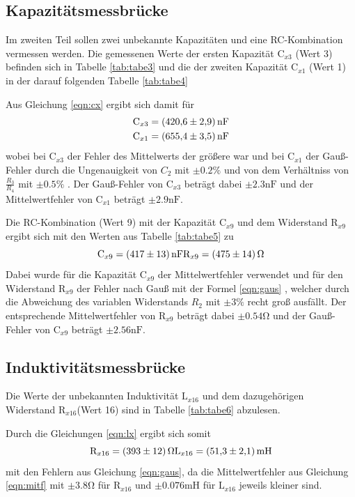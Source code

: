 \subsection{Kapazitätsmessbrücke}
Im zweiten Teil sollen zwei unbekannte Kapazitäten und eine RC-Kombination
vermessen werden. Die gemessenen Werte der ersten Kapazität $ \text{C}_{x3} $ (Wert 3) befinden
sich in Tabelle \ref{tab:tabe3} und die der zweiten Kapazität $ \text{C}_{x1} $
(Wert 1) in der
darauf folgenden Tabelle \ref{tab:tabe4}


\noindent Aus Gleichung \ref{eqn:cx}
ergibt sich damit für
\begin{align*}
  \text{C}_{x3} = \SI{420.6 (29)}{\nano\farad} \\
  \text{C}_{x1} = \SI{655.4 (35)}{\nano\farad}
\end{align*}
wobei bei $ \text{C}_{x3} $ der Fehler des Mittelwerts der größere war und bei
$ \text{C}_{x1} $ der Gauß-Fehler durch die Ungenauigkeit von $C_2$ mit $ \pm 0.2
\% $ und von dem Verhältniss von $ \frac{R_3}{R_4} $ mit $ \pm 0.5 \% $ .
Der Gauß-Fehler von $ \text{C}_{x3} $ beträgt
dabei $ \pm 2.3 \si{\nano\farad} $ und der Mittelwertfehler von $ \text{C}_{x1} $
beträgt $ \pm 2.9 \si{\nano\farad} $.


\noindent Die RC-Kombination (Wert 9) mit der Kapazität $ \text{C}_{x9} $ und dem
Widerstand $ \text{R}_{x9} $ ergibt sich
mit den Werten aus Tabelle \ref{tab:tabe5} zu
\begin{equation*}
  \text{C}_{x9} = \SI{417 (13)}{\nano\farad} \\
  \text{R}_{x9} = \SI{475 (14)}{\ohm}
\end{equation*}
Dabei wurde für die Kapazität $ \text{C}_{x9} $ der Mittelwertfehler verwendet und
für den Widerstand $ \text{R}_{x9} $ der Fehler nach Gauß mit der Formel \ref{eqn:gaus}
, welcher durch die Abweichung des variablen Widerstands $R_2$ mit $ \pm 3 \% $
recht groß ausfällt. Der entsprechende Mittelwertfehler von $ \text{R}_{x9} $
beträgt dabei $ \pm 0.54 \si{\ohm} $ und der Gauß-Fehler von $ \text{C}_{x9} $ beträgt
$ \pm 2.56 \si{\nano\farad} $.


\subsection{Induktivitätsmessbrücke}

Die Werte der unbekannten Induktivität $ \text{L}_{x16} $ und dem dazugehörigen
Widerstand $ \text{R}_{x16} $(Wert 16) sind in Tabelle
\ref{tab:tabe6} abzulesen.

Durch die Gleichungen \ref{eqn:lx}
ergibt sich somit
\begin{equation*}
  \text{R}_{x16} = \SI{393 (12)}{\ohm} \\
  \text{L}_{x16} = \SI{51.3 (21)}{\milli\henry}
\end{equation*}
mit den Fehlern aus Gleichung \ref{eqn:gaus}, da die Mittelwertfehler aus Gleichung
\ref{eqn:mitf} mit
$ \pm 3.8 \si{\ohm} $ für $ \text{R}_{x16} $ und $ \pm 0.076 \si{\milli\henry} $
für $ \text{L}_{x16} $ jeweils kleiner sind.

